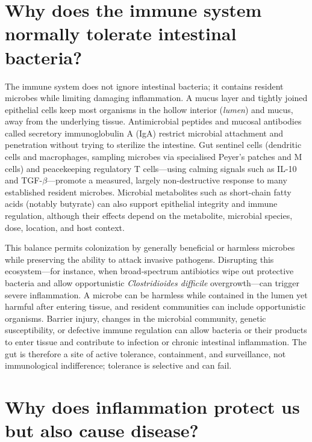 \documentclass[11pt,oneside]{report}
\begin{document}
\section{Why does the immune system normally tolerate intestinal bacteria?}

The immune system does not ignore intestinal bacteria; it contains resident
microbes while limiting damaging inflammation. A mucus layer and tightly joined
epithelial cells keep most organisms in the hollow interior (\emph{lumen}) and
mucus, away from the underlying tissue. Antimicrobial peptides and mucosal
antibodies called secretory immunoglobulin A (IgA) restrict microbial attachment
and penetration without trying to sterilize the intestine. Gut sentinel cells
(dendritic cells and macrophages, sampling microbes via specialised Peyer's
patches and M cells) and peacekeeping regulatory T cells—using calming signals
such as IL-10 and TGF-$\beta$—promote a measured, largely non-destructive
response to many established resident microbes. Microbial metabolites such as
short-chain fatty acids (notably butyrate) can also support epithelial
integrity and immune regulation, although their effects depend on the
metabolite, microbial species, dose, location, and host context.

This balance permits colonization by generally beneficial or harmless microbes
while preserving the ability to attack invasive pathogens. Disrupting this
ecosystem—for instance, when broad-spectrum antibiotics wipe out protective
bacteria and allow opportunistic \emph{Clostridioides difficile} overgrowth—can
trigger severe inflammation. A microbe can be
harmless while contained in the lumen yet harmful after entering tissue, and
resident communities can include opportunistic organisms. Barrier injury,
changes in the microbial community, genetic susceptibility, or defective
immune regulation can allow bacteria or their products to enter tissue and
contribute to infection or chronic intestinal inflammation. The gut is
therefore a site of active tolerance, containment, and surveillance, not
immunological indifference; tolerance is selective and can fail.

\section{Why does inflammation protect us but also cause disease?}
\end{document}

